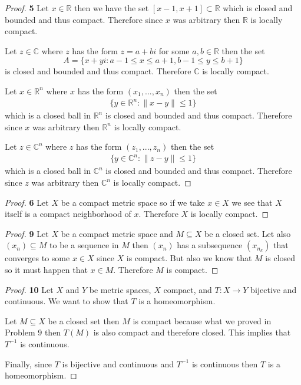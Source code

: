 \documentclass[11pt]{article}
\newcommand{\R}{\mathbb{R}}
\newcommand{\C}{\mathbb{C}}
\theoremstyle{definition}
\begin{document}
\begin{proof}{\textbf{5}}
    Let $x \in \R$ then we have the set $[x - 1,x + 1]\subset \R$ which is closed
    and bounded and thus compact. Therefore since $x$ was arbitrary then $\R$
    is locally compact.
    
    Let $z\in \C$ where $z$ has the form $z = a + bi$ for some $a,b\in \R$ 
    then the set
    $$A = \{x + yi : a - 1\leq x \leq a + 1, b - 1\leq y\leq b + 1\}$$
    is closed and bounded and thus compact. Therefore $\C$ is locally compact.

    Let $x \in \R^n$ where $x$ has the form $(x_1, ..., x_n)$ then the set
    \begin{align*}
        \{y \in \R^n: \|x - y\| \leq 1\}
    \end{align*}
    which is a closed ball in $\R^n$ is closed and bounded and thus compact.
    Therefore since $x$ was arbitrary then $\R^n$ is locally compact.

    Let $z \in \C^n$ where $z$ has the form $(z_1, ..., z_n)$ then the set
    \begin{align*}
        \{y \in \C^n: \|z - y\| \leq 1\}
    \end{align*}
    which is a closed ball in $\C^n$ is closed and bounded and thus compact.
    Therefore since $z$ was arbitrary then $\C^n$ is locally compact.
\end{proof}
\begin{proof}{\textbf{6}}
    Let $X$ be a compact metric space so if we take $x \in X$ we see that $X$
    itself is a compact neighborhood of $x$. Therefore $X$ is locally compact.
\end{proof}
\begin{proof}{\textbf{9}}
    Let $X$ be a compact metric space and $M \subseteq X$ be a closed set.
    Let also $(x_n) \subseteq M$ to be a sequence in $M$ then $(x_n)$ has a
    subsequence $(x_{n_k})$ that converges to some $x \in X$ since $X$ is
    compact. But also we know that $M$ is closed so it must happen that
    $x \in M$. Therefore $M$ is compact.
\end{proof}
\begin{proof}{\textbf{10}}
    Let $X$ and $Y$ be metric spaces, $X$ compact, and $T:X \to Y$
    bijective and continuous. We want to show that $T$ is a homeomorphism.

    Let $M \subseteq X$ be a closed set then $M$ is compact because what we
    proved in Problem 9 then $T(M)$ is also compact and therefore closed.
    This implies that $T^{-1}$ is continuous.

    Finally, since $T$ is bijective and continuous and $T^{-1}$ is continuous
    then $T$ is a homeomorphism.
\end{proof}
\cleardoublepage
\end{document}
